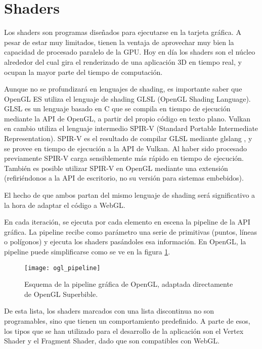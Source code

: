\section{Shaders}
\label{shaders}

Los shaders son programas diseñados para ejecutarse en la tarjeta gráfica. A pesar de estar muy limitados, tienen la ventaja de aprovechar muy bien la capacidad de procesado paralelo de la GPU. Hoy en día los shaders son el núcleo alrededor del cual gira el renderizado de una aplicación 3D en tiempo real, y ocupan la mayor parte del tiempo de computación.

Aunque no se profundizará en lenguajes de shading, es importante saber que OpenGL ES utiliza el lenguaje de shading GLSL (OpenGL Shading Language). GLSL es un lenguaje basado en C que se compila en tiempo de ejecución mediante la API de OpenGL, a partir del propio código en texto plano. Vulkan en cambio utiliza el lenguaje intermedio SPIR-V (Standard Portable Intermediate Representation). SPIR-V es el resultado de compilar GLSL mediante glslang , y se provee en tiempo de ejecución a la API de Vulkan. Al haber sido procesado previamente SPIR-V carga sensiblemente más rápido en tiempo de ejecución. También es posible utilizar SPIR-V en OpenGL mediante una extensión (refiriéndonos a la API de escritorio, no su versión para sistemas embebidos).

El hecho de que ambos partan del mismo lenguaje de shading será significativo a la hora de adaptar el código a WebGL.

En cada iteración, se ejecuta por cada elemento en escena la pipeline de la API gráfica. La pipeline recibe como parámetro una serie de primitivas (puntos, líneas o polígonos) y ejecuta los shaders pasándoles esa información. En OpenGL, la pipeline puede simplificarse como se ve en la figura \ref{fig:opengl_pipeline}.

\begin{figure}[H]
    \centering
    \texttt{[image: ogl\_pipeline]}
    \caption{Esquema de la pipeline gráfica de OpenGL, adaptada directamente de OpenGL Superbible.}
    \label{fig:opengl_pipeline}
\end{figure}

De esta lista, los shaders marcados con una lista discontinua no son programables, sino que tienen un comportamiento predefinido. A parte de esos, los tipos que se han utilizado para el desarrollo de la aplicación son el Vertex Shader y el Fragment Shader, dado que son compatibles con WebGL.

